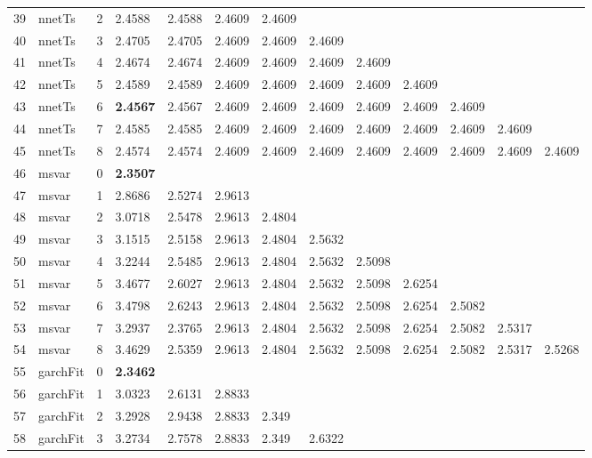\documentclass[10pt,a4paper]{article}
\begin{document}
\begin{table}[ht]
\begin{tabular}{rlrllllllllll}
  39 & nnetTs &     2 & 2.4588 & 2.4588 & 2.4609 & 2.4609 &  &  &  &  &  &  \\ 
  40 & nnetTs &     3 & 2.4705 & 2.4705 & 2.4609 & 2.4609 & 2.4609 &  &  &  &  &  \\ 
  41 & nnetTs &     4 & 2.4674 & 2.4674 & 2.4609 & 2.4609 & 2.4609 & 2.4609 &  &  &  &  \\ 
  42 & nnetTs &     5 & 2.4589 & 2.4589 & 2.4609 & 2.4609 & 2.4609 & 2.4609 & 2.4609 &  &  &  \\ 
  43 & nnetTs &     6 & \textbf{2.4567} & 2.4567 & 2.4609 & 2.4609 & 2.4609 & 2.4609 & 2.4609 & 2.4609 &  &  \\ 
  44 & nnetTs &     7 & 2.4585 & 2.4585 & 2.4609 & 2.4609 & 2.4609 & 2.4609 & 2.4609 & 2.4609 & 2.4609 &  \\ 
  45 & nnetTs &     8 & 2.4574 & 2.4574 & 2.4609 & 2.4609 & 2.4609 & 2.4609 & 2.4609 & 2.4609 & 2.4609 & 2.4609 \\ 
   \hline
46 & msvar &     0 & \textbf{2.3507} &  &  &  &  &  &  &  &  &  \\ 
  47 & msvar &     1 & 2.8686 & 2.5274 & 2.9613 &  &  &  &  &  &  &  \\ 
  48 & msvar &     2 & 3.0718 & 2.5478 & 2.9613 & 2.4804 &  &  &  &  &  &  \\ 
  49 & msvar &     3 & 3.1515 & 2.5158 & 2.9613 & 2.4804 & 2.5632 &  &  &  &  &  \\ 
  50 & msvar &     4 & 3.2244 & 2.5485 & 2.9613 & 2.4804 & 2.5632 & 2.5098 &  &  &  &  \\ 
  51 & msvar &     5 & 3.4677 & 2.6027 & 2.9613 & 2.4804 & 2.5632 & 2.5098 & 2.6254 &  &  &  \\ 
  52 & msvar &     6 & 3.4798 & 2.6243 & 2.9613 & 2.4804 & 2.5632 & 2.5098 & 2.6254 & 2.5082 &  &  \\ 
  53 & msvar &     7 & 3.2937 & 2.3765 & 2.9613 & 2.4804 & 2.5632 & 2.5098 & 2.6254 & 2.5082 & 2.5317 &  \\ 
  54 & msvar &     8 & 3.4629 & 2.5359 & 2.9613 & 2.4804 & 2.5632 & 2.5098 & 2.6254 & 2.5082 & 2.5317 & 2.5268 \\ 
   \hline
55 & garchFit &     0 & \textbf{2.3462} &  &  &  &  &  &  &  &  &  \\ 
  56 & garchFit &     1 & 3.0323 & 2.6131 & 2.8833 &  &  &  &  &  &  &  \\ 
  57 & garchFit &     2 & 3.2928 & 2.9438 & 2.8833 & 2.349 &  &  &  &  &  &  \\ 
  58 & garchFit &     3 & 3.2734 & 2.7578 & 2.8833 & 2.349 & 2.6322 &  &  &  &  &  \\ 

\end{tabular}
\end{table}
\end{document}
